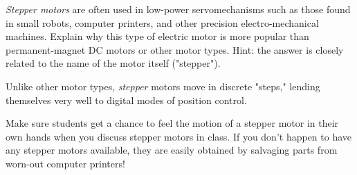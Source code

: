 

{\it Stepper motors} are often used in low-power servomechanisms such as those found in small robots, computer printers, and other precision electro-mechanical machines.  Explain why this type of electric motor is more popular than permanent-magnet DC motors or other motor types.  Hint: the answer is closely related to the name of the motor itself ("stepper").







Unlike other motor types, {\it stepper} motors move in discrete "steps," lending themselves very well to digital modes of position control.







Make sure students get a chance to feel the motion of a stepper motor in their own hands when you discuss stepper motors in class.  If you don't happen to have any stepper motors available, they are easily obtained by salvaging parts from worn-out computer printers!




